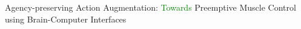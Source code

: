 









Agency-preserving Action Augmentation: \textcolor{green}{Towards} Preemptive Muscle Control using Brain-Computer
Interfaces



